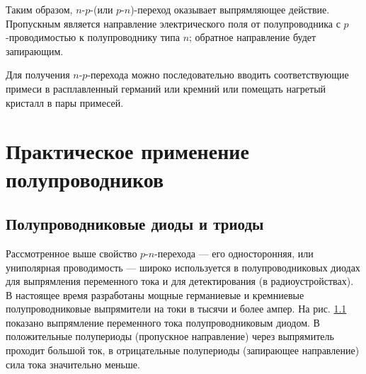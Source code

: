 \documentclass[a4paper,10pt]{book}
\begin{document}
Таким образом, $n$-$p$-(или $p$-$n$)-переход оказывает выпрямляющее действие. Пропускным является направление электрического поля от полупроводника с $p$-проводимостью к полупроводнику типа $n$; обратное направление будет запирающим.

Для получения $n$-$p$-перехода можно последовательно вводить соответствующие примеси в расплавленный германий или кремний или помещать нагретый кристалл в пары примесей.

\chapter{Практическое применение полупроводников}
\section{Полупроводниковые диоды и триоды}

Рассмотренное выше свойство $p$-$n$-перехода — его односторонняя, или униполярная проводимость — широко используется в полупроводниковых диодах для выпрямления переменного тока и для детектирования (в радиоустройствах). В настоящее время разработаны мощные германиевые и кремниевые полупроводниковые выпрямители на токи в тысячи и более ампер. На рис. \ref{pic61} показано выпрямление переменного тока полупроводниковым диодом. В положительные полупериоды (пропускное направление) через выпрямитель проходит большой ток, в отрицательные полупериоды (запирающее направление) сила тока значительно меньше.

\begin{figure}[h]
	\caption{}
	\label{pic61}
\end{figure}
\end{document}
